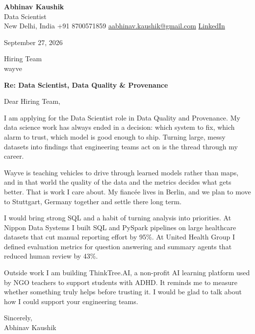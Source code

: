 \documentclass[11pt,a4paper]{article}
\begin{document}
{\Large\bfseries Abhinav Kaushik}\\
Data Scientist\\
New Delhi, India \textbar{} +91 8700571859 \textbar{} \href{mailto:aabhinav.kaushik@gmail.com}{aabhinav.kaushik@gmail.com} \textbar{} \href{https://www.linkedin.com/in/abhinav-kaushik10/}{LinkedIn}  

September 27, 2026

Hiring Team\\
wayve

\textbf{Re: Data Scientist, Data Quality \& Provenance}

Dear Hiring Team,

I am applying for the Data Scientist role in Data Quality and Provenance. My data science work has always ended in a decision: which system to fix, which alarm to trust, which model is good enough to ship. Turning large, messy datasets into findings that engineering teams act on is the thread through my career.

Wayve is teaching vehicles to drive through learned models rather than maps, and in that world the quality of the data and the metrics decides what gets better. That is work I care about. My fiancée lives in Berlin, and we plan to move to Stuttgart, Germany together and settle there long term.

I would bring strong SQL and a habit of turning analysis into priorities. At Nippon Data Systems I built SQL and PySpark pipelines on large healthcare datasets that cut manual reporting effort by 95\%. At United Health Group I defined evaluation metrics for question answering and summary agents that reduced human review by 43\%.

Outside work I am building ThinkTree.AI, a non-profit AI learning platform used by NGO teachers to support students with ADHD. It reminds me to measure whether something truly helps before trusting it. I would be glad to talk about how I could support your engineering teams.

Sincerely,\\[4pt]
Abhinav Kaushik
\end{document}
